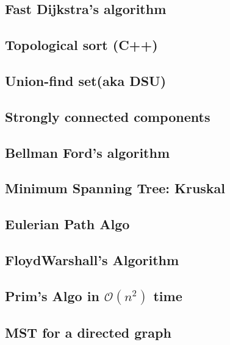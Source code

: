 \subsection{Fast Dijkstra's algorithm}
\raggedbottom
\hrulefill
\subsection{Topological sort (C++)}
\raggedbottom
\hrulefill
\subsection{Union-find set(aka DSU)}
\raggedbottom
\hrulefill
\subsection{Strongly connected components}
\raggedbottom
\hrulefill
\subsection{Bellman Ford's algorithm}
\raggedbottom
\hrulefill
\subsection{Minimum Spanning Tree: Kruskal}
\raggedbottom
\hrulefill
\subsection{Eulerian Path Algo}
\raggedbottom
\hrulefill
\subsection{FloydWarshall's Algorithm}
\raggedbottom
\hrulefill
\subsection{Prim's Algo in $\mathcal{O}(n^2)$ time}
\raggedbottom
\hrulefill
\subsection{MST for a directed graph}
\raggedbottom
\hrulefill
